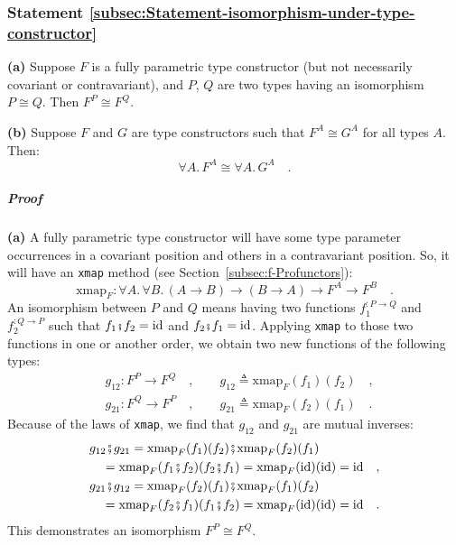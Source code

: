 \subsubsection{Statement \label{subsec:Statement-isomorphism-under-type-constructor}\ref{subsec:Statement-isomorphism-under-type-constructor}}

\textbf{(a)} Suppose $F$ is a fully parametric type constructor (but
not necessarily covariant or contravariant), and $P$, $Q$ are two
types having an isomorphism $P\cong Q$. Then $F^{P}\cong F^{Q}$.

\textbf{(b)} Suppose $F$ and $G$ are type constructors such that
$F^{A}\cong G^{A}$ for all types $A$. Then:
\[
\forall A.\,F^{A}\cong\forall A.\,G^{A}\quad.
\]


\subparagraph{Proof}

\textbf{(a)} A fully parametric type constructor will have some type
parameter occurrences in a covariant position and others in a contravariant
position. So, it will have an \lstinline!xmap! method (see Section~\ref{subsec:f-Profunctors}):
\[
\text{xmap}_{F}:\forall A.\,\forall B.\,(A\rightarrow B)\rightarrow(B\rightarrow A)\rightarrow F^{A}\rightarrow F^{B}\quad.
\]
An isomorphism between $P$ and $Q$ means having two functions $f_{1}^{:P\rightarrow Q}$
and $f_{2}^{:Q\rightarrow P}$ such that $f_{1}\bef f_{2}=\text{id}$
and $f_{2}\bef f_{1}=\text{id}$. Applying \lstinline!xmap! to those
two functions in one or another order, we obtain two new functions
of the following types:
\begin{align*}
 & g_{12}:F^{P}\rightarrow F^{Q}\quad,\quad\quad g_{12}\triangleq\text{xmap}_{F}(f_{1})(f_{2})\quad,\\
 & g_{21}:F^{Q}\rightarrow F^{P}\quad,\quad\quad g_{21}\triangleq\text{xmap}_{F}(f_{2})(f_{1})\quad.
\end{align*}
Because of the laws of \lstinline!xmap!, we find that $g_{12}$ and
$g_{21}$ are mutual inverses:
\begin{align*}
 & g_{12}\bef g_{21}=\text{xmap}_{F}(f_{1})(f_{2})\bef\text{xmap}_{F}(f_{2})(f_{1})\\
 & \quad=\text{xmap}_{F}(f_{1}\bef f_{2})(f_{2}\bef f_{1})=\text{xmap}_{F}(\text{id})(\text{id})=\text{id}\quad,\\
 & g_{21}\bef g_{12}=\text{xmap}_{F}(f_{2})(f_{1})\bef\text{xmap}_{F}(f_{1})(f_{2})\\
 & \quad=\text{xmap}_{F}(f_{2}\bef f_{1})(f_{1}\bef f_{2})=\text{xmap}_{F}(\text{id})(\text{id})=\text{id}\quad.
\end{align*}
This demonstrates an isomorphism $F^{P}\cong F^{Q}$.

